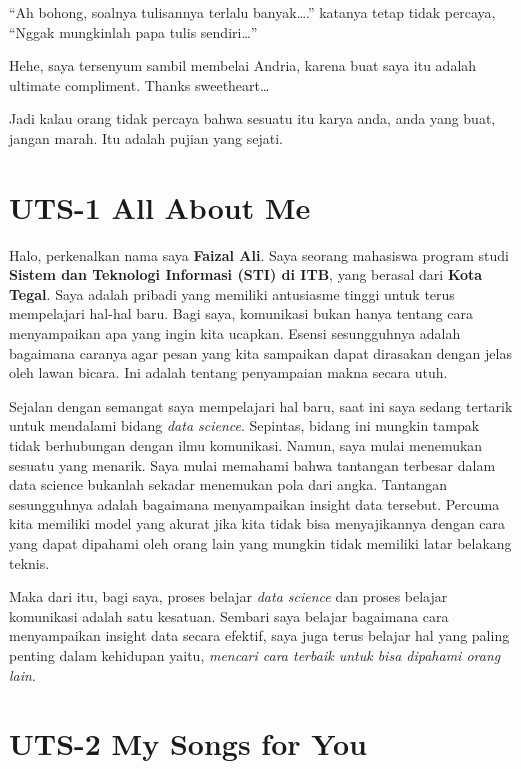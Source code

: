\documentclass[
  letterpaper,
  DIV=11,
  numbers=noendperiod]{scrreprt}
\begin{document}
``Ah bohong, soalnya tulisannya terlalu banyak\ldots.'' katanya tetap
tidak percaya, ``Nggak mungkinlah papa tulis sendiri\ldots{}''

Hehe, saya tersenyum sambil membelai Andria, karena buat saya itu adalah
ultimate compliment. Thanks sweetheart\ldots{}

Jadi kalau orang tidak percaya bahwa sesuatu itu karya anda, anda yang
buat, jangan marah. Itu adalah pujian yang sejati.


\chapter{UTS-1 All About Me}\label{uts-1-all-about-me}

Halo, perkenalkan nama saya \textbf{Faizal Ali}. Saya seorang mahasiswa
program studi \textbf{Sistem dan Teknologi Informasi (STI) di ITB}, yang
berasal dari \textbf{Kota Tegal}. Saya adalah pribadi yang memiliki
antusiasme tinggi untuk terus mempelajari hal-hal baru. Bagi saya,
komunikasi bukan hanya tentang cara menyampaikan apa yang ingin kita
ucapkan. Esensi sesungguhnya adalah bagaimana caranya agar pesan yang
kita sampaikan dapat dirasakan dengan jelas oleh lawan bicara. Ini
adalah tentang penyampaian makna secara utuh.

Sejalan dengan semangat saya mempelajari hal baru, saat ini saya sedang
tertarik untuk mendalami bidang \emph{data science}. Sepintas, bidang
ini mungkin tampak tidak berhubungan dengan ilmu komunikasi. Namun, saya
mulai menemukan sesuatu yang menarik. Saya mulai memahami bahwa
tantangan terbesar dalam data science bukanlah sekadar menemukan pola
dari angka. Tantangan sesungguhnya adalah bagaimana menyampaikan insight
data tersebut. Percuma kita memiliki model yang akurat jika kita tidak
bisa menyajikannya dengan cara yang dapat dipahami oleh orang lain yang
mungkin tidak memiliki latar belakang teknis.

Maka dari itu, bagi saya, proses belajar \emph{data science} dan proses
belajar komunikasi adalah satu kesatuan. Sembari saya belajar bagaimana
cara menyampaikan insight data secara efektif, saya juga terus belajar
hal yang paling penting dalam kehidupan yaitu, \emph{mencari cara
terbaik untuk bisa dipahami orang lain}.


\chapter{UTS-2 My Songs for You}\label{uts-2-my-songs-for-you}
\end{document}
